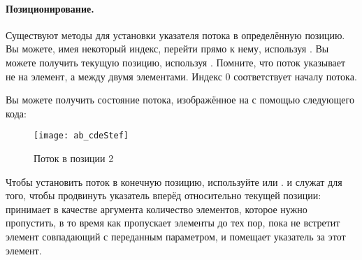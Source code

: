 \documentclass[a4paper,10pt,twoside]{book}
\begin{document}
\paragraph{Позиционирование.} Существуют методы для установки указателя потока в определённую позицию. Вы можете, имея некоторый индекс, перейти прямо к нему, используя . Вы можете получить текущую позицию, используя . Помните, что поток указывает не на элемент, а между двумя элементами. Индекс 0 соответствует началу потока.

Вы можете получить состояние потока, изображённое на  с помощью следующего кода:


\begin{figure}[h!t]
\centerline{\texttt{[image: ab\_cdeStef]}}
\caption{Поток в позиции 2}
\vspace{.2in}
\end{figure}

Чтобы установить поток в конечную позицию, используйте  или .  и  служат для того, чтобы продвинуть указатель вперёд относительно текущей позиции:  принимает в качестве аргумента количество элементов, которое нужно пропустить, в то время как  пропускает элементы до тех пор, пока не встретит элемент совпадающий с переданным параметром, и помещает указатель за этот элемент.
\end{document}

